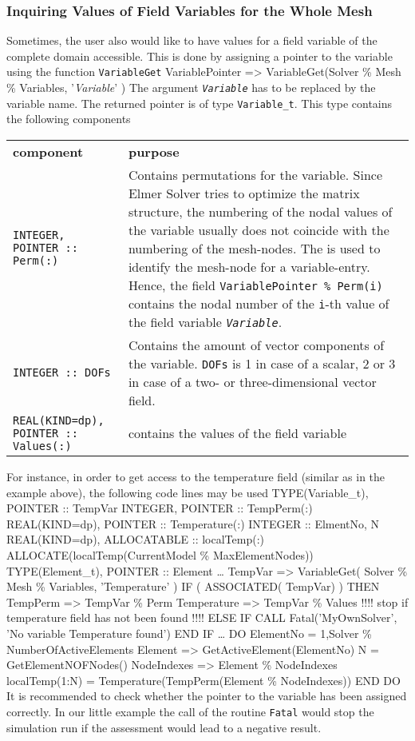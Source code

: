 \subsubsection{Inquiring Values of Field Variables for the Whole Mesh}
Sometimes, the user also would like to have values for a field variable of the complete domain accessible. This is done by assigning a pointer to the variable using the function \texttt{VariableGet}
\ttbegin
VariablePointer => VariableGet(Solver \% Mesh \% Variables, '\textit{Variable}' )
\ttend
The argument \texttt{\textit{Variable}} has to be replaced by the variable name. The returned pointer is of type \texttt{Variable\_t}. This type contains the following components
\begin{center}
\begin{tabular}{p{}  p{}}
\textbf{component}                            & \textbf{purpose}\\[2ex]
\texttt{INTEGER, POINTER :: Perm(:)} & Contains permutations for the variable. Since Elmer Solver tries to optimize the matrix structure, the numbering of the nodal values of the variable usually does not coincide with the numbering of the mesh-nodes. The is used to identify the mesh-node for a variable-entry. Hence, the field \texttt{VariablePointer \% Perm(i)} contains the nodal number of the \texttt{i}-th value of the field variable \texttt{\textit{Variable}}. \\
\texttt{INTEGER :: DOFs} & Contains the amount of vector components of the variable. \texttt{DOFs} is 1 in case of a scalar, 2 or 3 in case of a two- or three-dimensional vector field.\\
\texttt{REAL(KIND=dp), POINTER :: Values(:)} & contains the values of the field variable
\end{tabular}
\end{center}
For instance, in order to get access to the temperature field (similar as in the example above), the following code lines may be used
\ttbegin
TYPE(Variable_t), POINTER :: TempVar
INTEGER, POINTER :: TempPerm(:)
REAL(KIND=dp), POINTER :: Temperature(:)
INTEGER :: ElmentNo, N
REAL(KIND=dp), ALLOCATABLE :: localTemp(:)
ALLOCATE(localTemp(CurrentModel \% MaxElementNodes))
TYPE(Element_t), POINTER :: Element
\ldots
TempVar => VariableGet( Solver \% Mesh \% Variables, 'Temperature' )
IF ( ASSOCIATED( TempVar) ) THEN
  TempPerm    => TempVar \% Perm
  Temperature => TempVar \% Values
!!!! stop if temperature field has not been found !!!!
ELSE IF 
  CALL Fatal('MyOwnSolver', 'No variable Temperature found')
END IF
\ldots
DO ElementNo = 1,Solver \% NumberOfActiveElements
   Element => GetActiveElement(ElementNo)
   N = GetElementNOFNodes()
   NodeIndexes => Element \% NodeIndexes
   localTemp(1:N) = Temperature(TempPerm(Element \% NodeIndexes))
END DO
\ttend
It is recommended to check whether the pointer to the variable has been assigned correctly. In our little example the call of the routine \texttt{Fatal} would stop the simulation run if the assessment would lead to a negative result.
